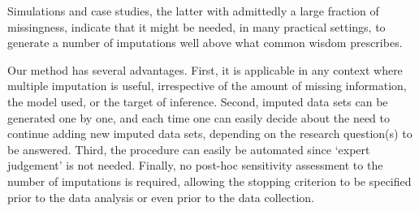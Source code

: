 \documentclass[11pt,a5paper,twoside]{book}
\begin{document}



Simulations and case studies, the latter with admittedly a large fraction of missingness, indicate that it might be needed, in many practical settings, to generate a number of imputations well above what common wisdom prescribes. 

Our method has several advantages. First, it is applicable in any context where multiple imputation is useful, irrespective of the amount of missing information, the model used, or the target of inference. Second, imputed data sets can be generated one by one, and each time one can easily decide about the need to continue adding new imputed data sets, depending on the research question(s) to be answered. Third, the procedure can easily be automated since `expert judgement' is not needed. Finally, no post-hoc sensitivity assessment to the number of imputations is required, allowing the stopping criterion to be specified prior to the data analysis or even prior to the data collection. 

{}

\end{document}

